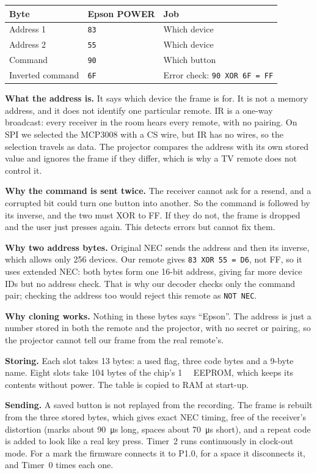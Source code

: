 \documentclass[11pt,a4paper]{article}
\newcommand{\code}[1]{\texttt{#1}}
\begin{document}
\begin{center}
\small
\begin{tabular}{@{}lll@{}}
\toprule
Byte & Epson POWER & Job\\
\midrule
Address 1 & \code{83} & Which device\\
Address 2 & \code{55} & Which device\\
Command & \code{90} & Which button\\
Inverted command & \code{6F} & Error check: \code{90 XOR 6F = FF}\\
\bottomrule
\end{tabular}
\end{center}

\textbf{What the address is.} It says which device the frame is for. It is not a memory address, and it does not identify one particular remote. IR is a one-way broadcast: every receiver in the room hears every remote, with no pairing. On SPI we selected the MCP3008 with a CS wire, but IR has no wires, so the selection travels as data. The projector compares the address with its own stored value and ignores the frame if they differ, which is why a TV remote does not control it.

\textbf{Why the command is sent twice.} The receiver cannot ask for a resend, and a corrupted bit could turn one button into another. So the command is followed by its inverse, and the two must XOR to FF. If they do not, the frame is dropped and the user just presses again. This detects errors but cannot fix them.

\textbf{Why two address bytes.} Original NEC sends the address and then its inverse, which allows only 256 devices. Our remote gives \code{83 XOR 55 = D6}, not FF, so it uses extended NEC: both bytes form one 16-bit address, giving far more device IDs but no address check. That is why our decoder checks only the command pair; checking the address too would reject this remote as \code{NOT NEC}.

\textbf{Why cloning works.} Nothing in these bytes says ``Epson''. The address is just a number stored in both the remote and the projector, with no secret or pairing, so the projector cannot tell our frame from the real remote's.

\textbf{Storing.} Each slot takes 13 bytes: a used flag, three code bytes and a 9-byte name. Eight slots take 104 bytes of the chip's \qty{1}{\kilo\byte} EEPROM, which keeps its contents without power. The table is copied to RAM at start-up.

\textbf{Sending.} A saved button is not replayed from the recording. The frame is rebuilt from the three stored bytes, which gives exact NEC timing, free of the receiver's distortion (marks about \qty{90}{\micro\second} long, spaces about \qty{70}{\micro\second} short), and a repeat code is added to look like a real key press. Timer~2 runs continuously in clock-out mode. For a mark the firmware connects it to P1.0, for a space it disconnects it, and Timer~0 times each one.
\end{document}
